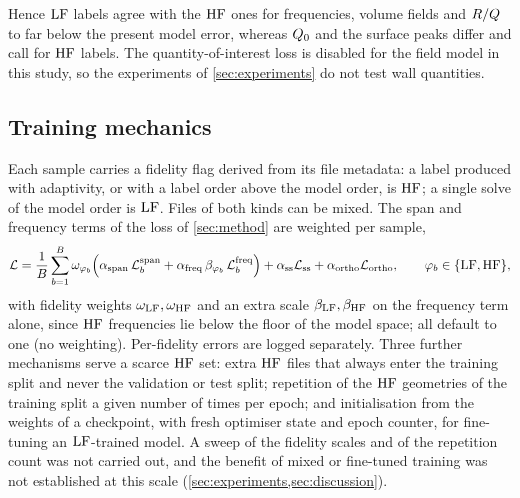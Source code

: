Hence $\mathrm{LF}$ labels agree with the $\mathrm{HF}$ ones for frequencies, volume fields and $R/Q$ to far below the present model
error, whereas $\Qz$ and the surface peaks differ and call for $\mathrm{HF}$ labels. The quantity-of-interest loss is disabled
for the field model in this study, so the experiments of \cref{sec:experiments} do not test wall quantities.

\subsection{Training mechanics}\label{sec:06-train}

Each sample carries a fidelity flag derived from its file metadata: a label produced with adaptivity, or with a label
order above the model order, is $\mathrm{HF}$; a single solve of the model order is $\mathrm{LF}$. Files of both kinds can be mixed.
The span and frequency terms of the loss of \cref{sec:method} are weighted per sample,
\begin{equation}
  \mathcal{L}=\frac1B\sum_{b=1}^{B}\omega_{\varphi_b}\Bigl(\alpha_{\mathrm{span}}\,\mathcal{L}^{\mathrm{span}}_b
   +\alpha_{\mathrm{freq}}\,\beta_{\varphi_b}\,\mathcal{L}^{\mathrm{freq}}_b\Bigr)
   +\alpha_{\mathrm{ss}}\mathcal{L}_{\mathrm{ss}}+\alpha_{\mathrm{ortho}}\mathcal{L}_{\mathrm{ortho}},
  \qquad \varphi_b\in\{\mathrm{LF},\mathrm{HF}\},
\end{equation}
with fidelity weights $\omega_{\mathrm{LF}},\omega_{\mathrm{HF}}$ and an extra scale $\beta_{\mathrm{LF}},\beta_{\mathrm{HF}}$ on the frequency term alone, since
$\mathrm{HF}$ frequencies lie below the floor of the model space; all default to one (no weighting). Per-fidelity errors are
logged separately.
Three further mechanisms serve a scarce $\mathrm{HF}$ set: extra $\mathrm{HF}$ files that always enter the training split and never the
validation or test split; repetition of the $\mathrm{HF}$ geometries of the training split a given number of times per epoch; and
initialisation from the weights of a checkpoint, with fresh optimiser state and epoch counter, for fine-tuning an
$\mathrm{LF}$-trained model. A sweep of the fidelity scales and of the repetition count was not carried out, and the benefit of
mixed or fine-tuned training was not established at this scale (\cref{sec:experiments,sec:discussion}).
